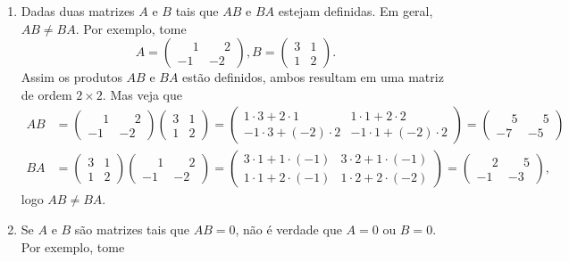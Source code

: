 \begin{observacoes}
\begin{enumerate}
        \item Dadas duas matrizes $A$ e $B$ tais que $AB$ e $BA$ estejam definidas. Em geral, $AB \ne BA$. Por exemplo, tome
            \[
                A = \begin{pmatrix}\phantom{-}1& \phantom{-}2\\-1 & -2\end{pmatrix},
                B = \begin{pmatrix}3 & 1 \\ 1 & 2\end{pmatrix}.
            \]
            Assim os produtos $AB$ e $BA$ estão definidos, ambos resultam em uma matriz de ordem $2 \times 2$. Mas veja que
            \begin{align*}
                AB &= \begin{pmatrix}\phantom{-}1 & \phantom{-}2\\-1 & -2\end{pmatrix}\begin{pmatrix}3 & 1\\1 & 2\end{pmatrix} =
                \begin{pmatrix}1\cdot 3 + 2 \cdot 1 & 1\cdot 1 + 2 \cdot 2\\-1\cdot3 + (-2)\cdot 2 & -1\cdot 1+ (-2)\cdot 2\end{pmatrix} =
                \begin{pmatrix}\phantom{-}5 & \phantom{-}5\\-7 & -5\end{pmatrix}\\
                BA &=\begin{pmatrix}3 & 1\\1 & 2\end{pmatrix}\begin{pmatrix}\phantom{-}1 & \phantom{-}2\\-1 & -2\end{pmatrix} = \begin{pmatrix}3\cdot 1 +
                1\cdot(-1) & 3\cdot 2 + 1\cdot(-1)\\1\cdot 1 + 2\cdot(-1) & 1\cdot 2 + 2 \cdot(-2)\end{pmatrix} =
                \begin{pmatrix}\phantom{-}2 & \phantom{-}5\\-1 & -3\end{pmatrix},
            \end{align*}
            logo $AB \ne BA$.
        \item Se $A$ e $B$ são matrizes tais que $AB = 0$, não é verdade que $A = 0$ ou $B = 0$. Por exemplo, tome

\end{enumerate}
\end{observacoes}
